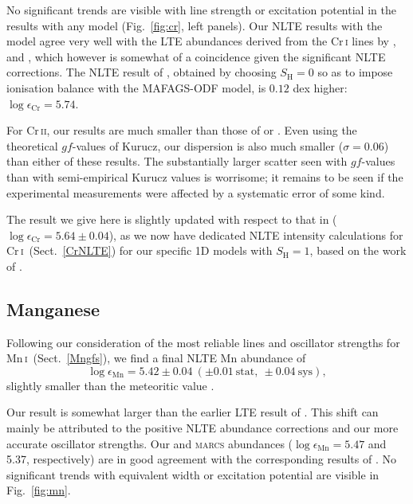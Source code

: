 \documentclass[traditabstract]{aa}
\newcommand{\altcri}{Cr\,\textsc{i}}
\newcommand{\altcrii}{Cr\,\textsc{ii}}
\newcommand{\altmni}{Mn\,\textsc{i}}
\newcommand{\cri}{\altcri\ }
\newcommand{\mni}{\altmni\ }
\begin{document}
No significant trends are visible with line strength or excitation potential in the results with any model (Fig.~\ref{fig:cr}, left panels). Our NLTE results with the  model agree very well with the LTE abundances derived from the Cr\,\textsc{i} lines by \citet[][$\log \epsilon_\mathrm{Cr}=5.67$]{Biemont78c}, \citet[][$\log \epsilon_\mathrm{Cr}=5.68$]{Blackwell87} and \citet[][$\log \epsilon_\mathrm{Cr}=5.64$]{Sobeck07}, which however is somewhat of a coincidence given the significant NLTE corrections.  The NLTE result of \citet{Bergemann11}, obtained by choosing $S_\mathrm{H}=0$ so as to impose ionisation balance with the MAFAGS-ODF model, is $0.12$ dex higher: $\log \epsilon_\mathrm{Cr}=5.74$.

For \altcrii, our results are much smaller than those of \citet[][$\log \epsilon_\mathrm{Cr}=5.67\pm0.13$ with \textsc{marcs}, $\log \epsilon_\mathrm{Cr}=5.77\pm0.13$ with \protect{}]{Sobeck07} or \citet[][$\log \epsilon_\mathrm{Cr}=5.79\pm0.12$ with MAFAGS-ODF]{Bergemann10}.  Even using the theoretical $gf$-values of Kurucz, our dispersion is also much smaller ($\sigma=0.06$) than either of these results.  The substantially larger scatter seen with \citet{Nilsson06} $gf$-values \citep[as used by][]{Sobeck07,Bergemann10} than with semi-empirical Kurucz values is worrisome; it remains to be seen if the experimental measurements were affected by a systematic error of some kind.

The result we give here is slightly updated with respect to that in  ($\log \epsilon_\mathrm{Cr}=5.64\pm0.04$), as we now have dedicated NLTE intensity calculations for \cri (Sect.~\ref{CrNLTE}) for our specific 1D models with $S_\mathrm{H}=1$, based on the work of \citet{Bergemann10}.

\subsection{Manganese}
\label{Mnresults}

Following our consideration of the most reliable lines and oscillator strengths for \mni (Sect.~\ref{Mngfs}), we find a final NLTE Mn abundance of
\begin{displaymath}
\log \epsilon_\mathrm{Mn}=5.42\pm0.04\ (\pm0.01\ \mathrm{stat},\ \pm0.04\ \mathrm{sys}),
\end{displaymath}
slightly smaller than the meteoritic value \citep[$5.48\pm0.01$;][]{Lodders09}.  

Our result is somewhat larger than the earlier LTE  result of \citet[][$\log \epsilon_\mathrm{Mn}=5.39$]{Booth84b}. This shift can mainly be attributed to the positive NLTE abundance corrections and our more accurate oscillator strengths.  Our  and \textsc{marcs} abundances ($\log \epsilon_\mathrm{Mn}=5.47$ and 5.37, respectively) are in good agreement with the corresponding results of \citet[][$\log \epsilon_\mathrm{Mn}=5.46$ and 5.37, respectively]{BW07}.  No significant trends with equivalent width or excitation potential are visible in Fig.~\ref{fig:mn}.
\end{document}
